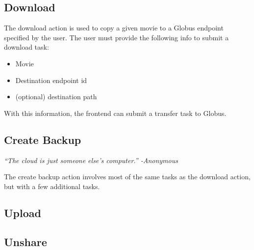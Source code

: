 \subsection{Download}

The download action is used to copy a given movie to a Globus endpoint specified by the user.
The user must provide the following info to submit a download task:

\begin{itemize}\itemsep1pt
    \item Movie
    \item Destination endpoint id
    \item (optional) destination path
\end{itemize}

\noindent With this information, the frontend can submit a transfer task to Globus.

\subsection{Create Backup}

\emph{``The cloud is just someone else's computer.'' -Anonymous}

\noindent The create backup action involves most of the same tasks as the download action, 
but with a few additional tasks.

\subsection{Upload}

\subsection{Unshare}
